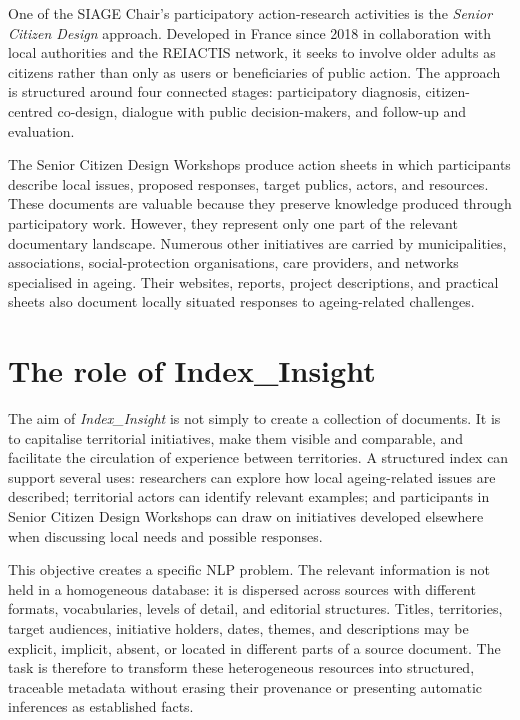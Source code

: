 One of the SIAGE Chair's participatory action-research activities is the
\textit{Senior Citizen Design} approach. Developed in France since 2018 in
collaboration with local authorities and the REIACTIS network, it seeks to
involve older adults as citizens rather than only as users or beneficiaries of
public action. The approach is structured around four connected stages:
participatory diagnosis, citizen-centred co-design, dialogue with public
decision-makers, and follow-up and evaluation.

The Senior Citizen Design Workshops produce action sheets in which participants
describe local issues, proposed responses, target publics, actors, and resources.
These documents are valuable because they preserve knowledge produced through
participatory work. However, they represent only one part of the relevant
documentary landscape. Numerous other initiatives are carried by municipalities,
associations, social-protection organisations, care providers, and networks
specialised in ageing. Their websites, reports, project descriptions, and
practical sheets also document locally situated responses to ageing-related
challenges.

\section{The role of Index\_Insight}

The aim of \textit{Index\_Insight} is not simply to create a collection of
documents. It is to capitalise territorial initiatives, make them visible and
comparable, and facilitate the circulation of experience between territories. A
structured index can support several uses: researchers can explore how local
ageing-related issues are described; territorial actors can identify relevant
examples; and participants in Senior Citizen Design Workshops can draw on
initiatives developed elsewhere when discussing local needs and possible
responses.

This objective creates a specific NLP problem. The relevant information is not
held in a homogeneous database: it is dispersed across sources with different
formats, vocabularies, levels of detail, and editorial structures. Titles,
territories, target audiences, initiative holders, dates, themes, and descriptions
may be explicit, implicit, absent, or located in different parts of a source
document. The task is therefore to transform these heterogeneous resources into
structured, traceable metadata without erasing their provenance or presenting
automatic inferences as established facts.

